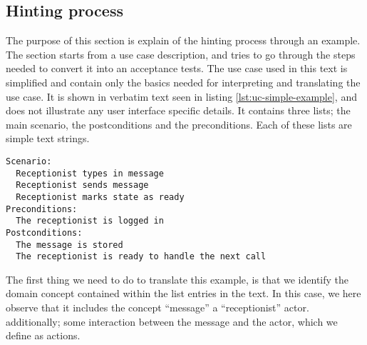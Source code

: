 \subsection{Hinting process}
The purpose of this section is explain of the hinting process through an example. The section starts from a use case description, and tries to go through the steps needed to convert it into an acceptance tests. The use case used in this text is simplified and contain only the basics needed for interpreting and translating the use case. It is shown in verbatim text seen in listing \ref{lst:uc-simple-example}, and does not illustrate any user interface specific details. It contains three lists; the main scenario, the postconditions and the preconditions. Each of these lists are simple text strings.

\begin{lstlisting}[frame=single,style=usecase, caption=Use case example, label=lst:uc-simple-example]
Scenario:
  Receptionist types in message
  Receptionist sends message
  Receptionist marks state as ready 
Preconditions:
  The receptionist is logged in
Postconditions:
  The message is stored
  The receptionist is ready to handle the next call
\end{lstlisting}
The first thing we need to do to translate this example, is that we identify the domain concept contained within the list entries in the text. In this case, we here observe that it includes the concept ``message'' a ``receptionist'' actor. additionally; some interaction between the message and the actor, which we define as actions.\medskip

